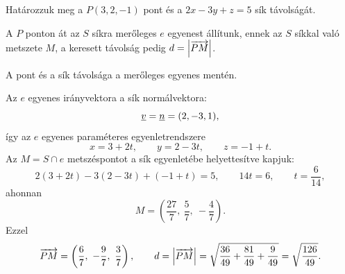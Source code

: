 \documentclass[11pt]{article}
\begin{document}
\begin{exbox}
\begin{example}
Határozzuk meg a $P(3, 2, -1)$ pont és a $2x-3y+z=5$ sík távolságát.
\end{example}
\end{exbox}
\begin{solution}
A $P$ ponton át az $S$ síkra merőleges $e$ egyenest állítunk, ennek az $S$ síkkal való metszete $M$, a keresett távolság pedig $d=\left|\overrightarrow{PM}\right|$.

\begin{notefig}{A pont és a sík távolsága a merőleges egyenes mentén.}
\end{notefig}

Az $e$ egyenes irányvektora a sík normálvektora:
\[
\underline{v}=\underline{n}=(2, -3, 1),
\]
így az $e$ egyenes paraméteres egyenletrendszere
\[
x=3+2t,\qquad y=2-3t,\qquad z=-1+t .
\]
Az $M=S\cap e$ metszéspontot a sík egyenletébe helyettesítve kapjuk:
\[
2(3+2t)-3(2-3t)+(-1+t)=5,\qquad 14t=6,\qquad t=\frac{6}{14},
\]
ahonnan
\[
M=\left(\frac{27}{7},\ \frac{5}{7},\ -\frac{4}{7}\right).
\]
Ezzel
\[
\overrightarrow{PM}=\left(\frac{6}{7},\ -\frac{9}{7},\ \frac{3}{7}\right),\qquad
d=\abs{\overrightarrow{PM}}=\sqrt{\frac{36}{49}+\frac{81}{49}+\frac{9}{49}}=\sqrt{\frac{126}{49}} .
\]


\end{solution}
\end{document}
